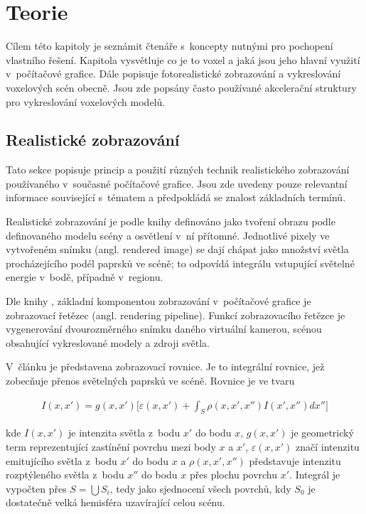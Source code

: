 \chapter{Teorie}
\label{teorie}
Cílem této kapitoly je seznámit čtenáře s~koncepty nutnými pro pochopení vlastního řešení. Kapitola vysvětluje co je to voxel a jaká jsou jeho hlavní využití v~počítačové grafice. Dále popisuje fotorealistické zobrazování a vykreslování voxelových scén obecně. Jsou zde popsány často používané akcelerační struktury pro vykreslování voxelových modelů.

\section{Realistické zobrazování}
Tato sekce popisuje princip a použití různých technik realistického zobrazování používaného v~současné počítačové grafice. Jsou zde uvedeny pouze relevantní informace související s~tématem a předpokládá se znalost základních termínů.

Realistické zobrazování je podle knihy \cite{gfx_principles_practice} definováno jako tvoření obrazu podle definovaného modelu scény a osvětlení v~ní přítomné. Jednotlivé pixely ve vytvořeném snímku (angl. rendered image) se dají chápat jako množství světla procházejícího podél paprsků ve scéně; to odpovídá integrálu vstupující světelné energie v~bodě, případně v~regionu.

Dle knihy \cite{real_time_render}, základní komponentou zobrazování v~počítačové grafice je zobrazovací řetězec (angl. rendering pipeline). Funkcí zobrazovacího řetězce je vygenerování dvourozměrného snímku daného virtuální kamerou, scénou obsahující vykreslované modely a zdroji světla.

V~článku \cite{render_eq} je představena zobrazovací rovnice. Je to integrální rovnice, jež zobecňuje přenos světelných paprsků ve scéně. Rovnice je ve tvaru

\begin{equation} \label{eq:render}
	\begin{gathered}
		I(x, x') = g(x, x') \Big[\varepsilon(x, x') + \int_S\rho(x, x', x'')I(x', x'')dx''\Big]
	\end{gathered}
\end{equation}

kde $I(x, x')$ je intenzita světla z~bodu $x'$ do bodu $x$, $g(x, x')$ je geometrický term reprezentující zastínění povrchu mezi body $x$ a $x'$, $\varepsilon(x, x')$ značí intenzitu emitujícího světla z~bodu $x'$ do bodu $x$ a $\rho(x, x', x'')$ představuje intenzitu rozptýleného světla z~bodu $x''$ do bodu $x$ přes plochu povrchu $x'$. Integrál je vypočten přes $S = \bigcup S_i$, tedy jako sjednocení všech povrchů, kdy $S_0$ je dostatečně velká hemisféra uzavírající celou scénu.

